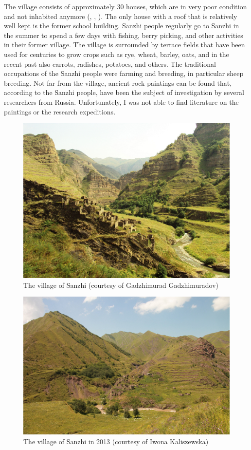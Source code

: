 The village consists of approximately 30 houses, which are in very poor condition and not inhabited anymore (, , ). The only house with a roof that is relatively well kept is the former school building. Sanzhi people regularly go to Sanzhi in the summer to spend a few days with fishing, berry picking, and other activities in their former village. The village is surrounded by terrace fields that have been used for centuries to grow crops such as rye, wheat, barley, oats, and in the recent past also carrots, radishes, potatoes, and others. The traditional occupations of the Sanzhi people were farming and breeding, in particular sheep breeding. Not far from the village, ancient rock paintings can be found that, according to the Sanzhi people, have been the subject of investigation by several researchers from Russia. Unfortunately, I was not able to find literature on the paintings or the research expeditions.

\begin{figure}
	\caption{The village of Sanzhi (courtesy of Gadzhimurad Gadzhimuradov)}
	\label{fig:Sanzhi 1}
	\includegraphics[scale=0.5, angle =90]{figures/Sanzhi_1.png}
\end{figure}

\begin{figure}
	\caption{The village of Sanzhi in 2013 (courtesy of Iwona Kaliszewska)}
	\label{fig:Sanzhi 2}
	\includegraphics[scale=0.5]{figures/Sanzhi_2.png}
\end{figure}

